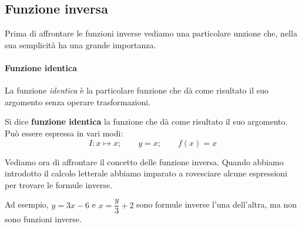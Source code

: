 \subsection{Funzione inversa}

Prima di affrontare le funzioni inverse vediamo una particolare unzione che,
nella sua semplicità ha una grande importanza.

\paragraph{Funzione identica}

La funzione \emph{identica} è la particolare funzione che dà come risultato 
il suo argomento senza operare trasformazioni. 

\begin{definizione}
Si dice \textbf{funzione identica} la funzione che dà come risultato il 
suo argomento.
Può essere espressa in vari modi:
\[I: x \mapsto x; \qquad y = x; \qquad f(x) = x\]
\end{definizione}

Vediamo ora di affrontare il concetto delle funzione inversa.
Quando abbiamo introdotto il calcolo letterale abbiamo imparato a 
rovesciare alcune espressioni per trovare le formule inverse.

Ad esempio, \(y = 3x -6\) e \(x = \dfrac{y}{3} +2\) 
sono formule inverse l'una dell'altra, ma non sono funzioni inverse.


